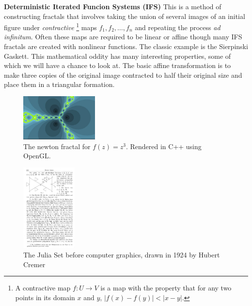 \documentclass[11pt,oneside,final]{article}
\begin{document}
\noindent\textbf{Deterministic Iterated Funcion Systems (IFS)} This is a method
of constructing fractals that involves taking the union of several images of an
initial figure under \emph{contractive} \footnote{A contractive map \(f: U
\rightarrow V\) is a map with the property that for any two points in its
domain \(x\) and \(y\), \(|f(x) - f(y)| < |x-y|\).} maps \(f_1, f_2,
\ldots, f_n\) and repeating the process \emph{ad infinitum}.  Often these
maps are required to be linear or affine though many IFS fractals are
created with nonlinear functions. The classic example is the Sierpinski
Gaskett.  This mathematical oddity has many interesting properties, some of
which we will have a chance to look at. The basic affine transformation is
to make three copies of the original image contracted to half their
original size and place them in a triangular formation. \\

\begin{figure}
	\includegraphics[width=0.35\textwidth]{newton_z3-1}
	\caption{The newton fractal for \(f(z) = z^3\). Rendered in C++ using OpenGL.}
\end{figure}

\begin{figure}
	\includegraphics[width=0.25\textwidth]{julia_triangles}
	\caption{The Julia Set before computer graphics, drawn in 1924 by Hubert
	Cremer \cite{wahl}}
\end{figure}
\end{document}
